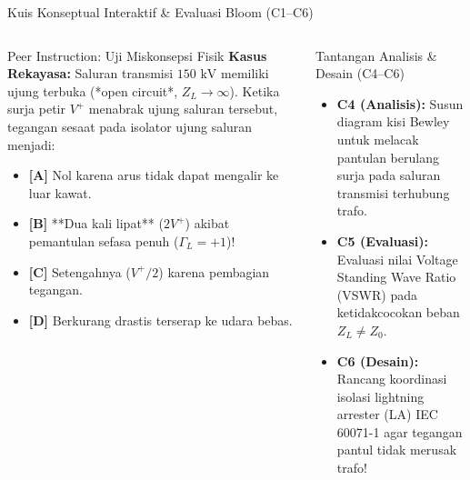 \documentclass[aspectratio=169,10pt]{beamer}
\begin{document}
\begin{frame}{Kuis Konseptual Interaktif \& Evaluasi Bloom (C1--C6)}
  \begin{columns}[t]
    \begin{alertblock}{Peer Instruction: Uji Miskonsepsi Fisik}
      \footnotesize
      \textbf{Kasus Rekayasa:} Saluran transmisi $150\text{ kV}$ memiliki ujung terbuka (*open circuit*, $Z_L \to \infty$). Ketika surja petir $V^+$ menabrak ujung saluran tersebut, tegangan sesaat pada isolator ujung saluran menjadi:
      \vspace{0.05cm}
      \begin{itemize}\setlength{\itemsep}{1pt}
        \item \textbf{[A]} Nol karena arus tidak dapat mengalir ke luar kawat.
        \item \textbf{[B]} **Dua kali lipat** ($2V^+$) akibat pemantulan sefasa penuh ($\Gamma_L = +1$)!
        \item \textbf{[C]} Setengahnya ($V^+/2$) karena pembagian tegangan.
        \item \textbf{[D]} Berkurang drastis terserap ke udara bebas.
      \end{itemize}
    \end{alertblock}

    \begin{block}{Tantangan Analisis \& Desain (C4--C6)}
      \footnotesize
      \begin{itemize}\setlength{\itemsep}{2pt}
        \item \textbf{C4 (Analisis):} Susun diagram kisi Bewley untuk melacak pantulan berulang surja pada saluran transmisi terhubung trafo.
        \item \textbf{C5 (Evaluasi):} Evaluasi nilai Voltage Standing Wave Ratio (VSWR) pada ketidakcocokan beban $Z_L \ne Z_0$.
        \item \textbf{C6 (Desain):} Rancang koordinasi isolasi lightning arrester (LA) IEC 60071-1 agar tegangan pantul tidak merusak trafo!
      \end{itemize}
    \end{block}
  \end{columns}
\end{frame}
\end{document}
